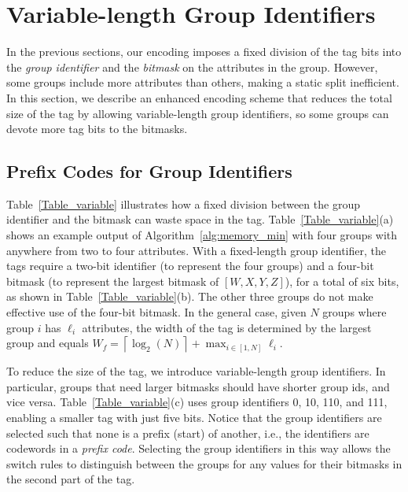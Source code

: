 \section{Variable-length Group Identifiers}
\label{sec:identifiers}
In the previous sections, our encoding imposes a fixed division of the
tag bits into the \emph{group identifier} and the \emph{bitmask} on
the attributes in the group.  However, some groups include more
attributes than others, making a static split inefficient. In this
section, we describe an enhanced encoding scheme that reduces the
total size of the tag by allowing variable-length group identifiers,
so some groups can devote more tag bits to the bitmasks.

\subsection{Prefix Codes for Group Identifiers}
Table~\ref{Table_variable} illustrates how a fixed division between
the group identifier and the bitmask can waste space in the tag.
Table~\ref{Table_variable}(a) shows an example output of
Algorithm~\ref{alg:memory_min} with four groups with anywhere from two
to four attributes.  With a fixed-length group identifier, the tags
require a two-bit identifier (to represent the four groups) and a
four-bit bitmask (to represent the largest bitmask of $[W,X,Y,Z]$),
for a total of six bits, as shown in Table~\ref{Table_variable}(b).
The other three groups do not make effective use of the four-bit
bitmask.  In the general case, given $N$ groups where group $i$ has
$\ell_i$ attributes, the width of the tag is determined by the largest
group and equals $W_{f} = \left \lceil \log_2(N) \right \rceil +
\max_{i \in [1,N]} \ell_i$.

To reduce the size of the tag, we introduce variable-length group
identifiers.  In particular, groups that need larger bitmasks should
have shorter group ids, and vice versa.  Table~\ref{Table_variable}(c)
uses group identifiers 0, 10, 110, and 111, enabling a smaller tag with
just five bits.  Notice that the group identifiers are selected such
that none is a prefix (start) of another, i.e., the identifiers are
codewords in a \emph{prefix code}.  Selecting the group identifiers in
this way allows the switch rules to distinguish between the groups
for any values for their bitmasks in the second part of the tag.

%
%

